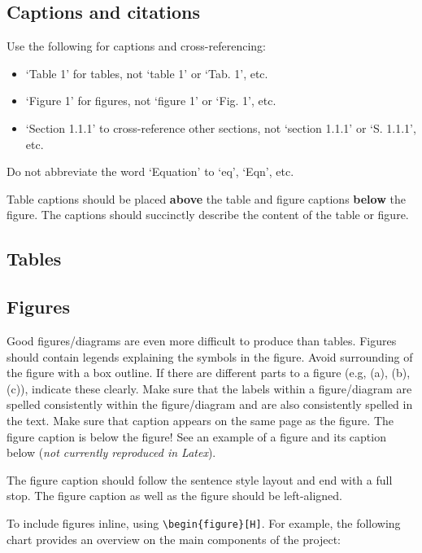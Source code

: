 \documentclass{newseye_del}
\begin{document}
\subsection{Captions and citations}

Use the following for captions and cross-referencing:

\begin{itemize}
    \item `Table 1' for tables, not `table 1' or `Tab. 1', etc.
    \item `Figure 1' for figures, not `figure 1' or `Fig. 1', etc.
    \item `Section 1.1.1' to cross-reference other sections, not `section 1.1.1'
      or `S. 1.1.1', etc.
\end{itemize}


Do not abbreviate the word `Equation' to `eq', `Eqn', etc.

Table captions should be placed \textbf{above} the table and figure captions
\textbf{below} the figure. The captions should succinctly describe the content
of the table or figure.


\subsection{Tables}

\subsection{Figures}

Good figures/diagrams are even more difficult to produce than tables. Figures
should contain legends explaining the symbols in the figure. Avoid surrounding
of the figure with a box outline. If there are different parts to a figure (e.g,
(a), (b), (c)), indicate these clearly. Make sure that the labels within a
figure/diagram are spelled consistently within the figure/diagram and are also
consistently spelled in the text. Make sure that caption appears on the same
page as the figure. The figure caption is below the figure! See an example of a
figure and its caption below (\textit{not currently reproduced in Latex}).

The figure caption should follow the sentence style layout and end with a full
stop. The figure caption as well as the figure should be left-aligned.

To include figures inline, using \verb.\begin{figure}[H]..
For example, the following chart provides an overview on the main components of the project:
\end{document}
